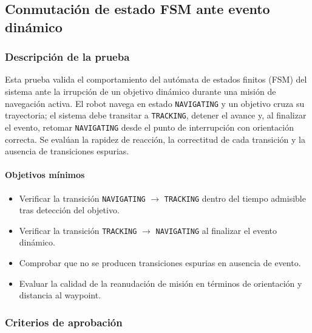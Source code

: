 \subsection{Conmutación de estado FSM ante evento dinámico}

\subsubsection{Descripción de la prueba}

Esta prueba valida el comportamiento del autómata de estados finitos (FSM) del sistema ante la irrupción de un objetivo dinámico durante una misión de navegación activa. El robot navega en estado \texttt{NAVIGATING} y un objetivo cruza su trayectoria; el sistema debe transitar a \texttt{TRACKING}, detener el avance y, al finalizar el evento, retomar \texttt{NAVIGATING} desde el punto de interrupción con orientación correcta. Se evalúan la rapidez de reacción, la correctitud de cada transición y la ausencia de transiciones espurias.

\paragraph{Objetivos mínimos}
\begin{itemize}
    \item Verificar la transición \texttt{NAVIGATING} $\to$ \texttt{TRACKING} dentro del tiempo admisible tras detección del objetivo.
    \item Verificar la transición \texttt{TRACKING} $\to$ \texttt{NAVIGATING} al finalizar el evento dinámico.
    \item Comprobar que no se producen transiciones espurias en ausencia de evento.
    \item Evaluar la calidad de la reanudación de misión en términos de orientación y distancia al waypoint.
\end{itemize}

\subsubsection{Criterios de aprobación}

